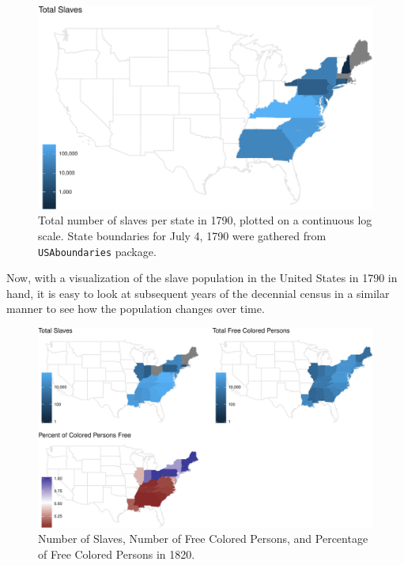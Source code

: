 \documentclass[11pt,]{article}
\begin{document}
\begin{figure}[htbp]
\centering
\includegraphics{writeup_files/figure-latex/chunk-1790-map-1.pdf}
\caption{Total number of slaves per state in 1790, plotted on a
continuous log scale. State boundaries for July 4, 1790 were gathered
from \texttt{USAboundaries} package.}
\end{figure}

Now, with a visualization of the slave population in the United States
in 1790 in hand, it is easy to look at subsequent years of the decennial
census in a similar manner to see how the population changes over time.

\begin{figure}[htbp]
\centering
\includegraphics{writeup_files/figure-latex/unnamed-chunk-5-1.pdf}
\caption{Number of Slaves, Number of Free Colored Persons, and
Percentage of Free Colored Persons in 1820.}
\end{figure}
\end{document}
